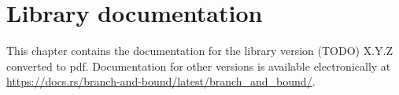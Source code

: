 \appendix

\chapter{Library documentation}
\label{appex:libdoc}

This chapter contains the documentation for the library version (TODO) X.Y.Z converted to pdf.
Documentation for other versions is available electronically at
\url{https://docs.rs/branch-and-bound/latest/branch_and_bound/}.












